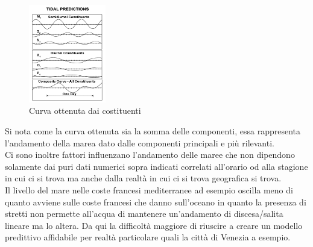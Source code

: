 \begin{figure}[H]
    \centering
    \includegraphics[width=0.3\textwidth]{res/cap2/Tidal_constituent_sum}
    \caption{Curva ottenuta dai costituenti}
\end{figure}

Si nota come la curva ottenuta sia la somma delle componenti, essa rappresenta l'andamento della marea dato dalle componenti principali e più rilevanti.\\
Ci sono inoltre fattori influenzano l'andamento delle maree che non dipendono solamente dai puri dati numerici sopra indicati correlati all'orario od alla stagione in cui ci si trova ma anche dalla realtà in cui ci si trova geografica si trova.\\
Il livello del mare nelle coste francesi mediterranee ad esempio oscilla meno di quanto avviene sulle coste francesi che danno sull'oceano in quanto la presenza di stretti non permette all'acqua di mantenere un'andamento di discesa/salita lineare ma lo altera. Da qui la difficoltà maggiore di riuscire a creare un modello predittivo affidabile per realtà particolare quali la città di Venezia a esempio.
\newpage
